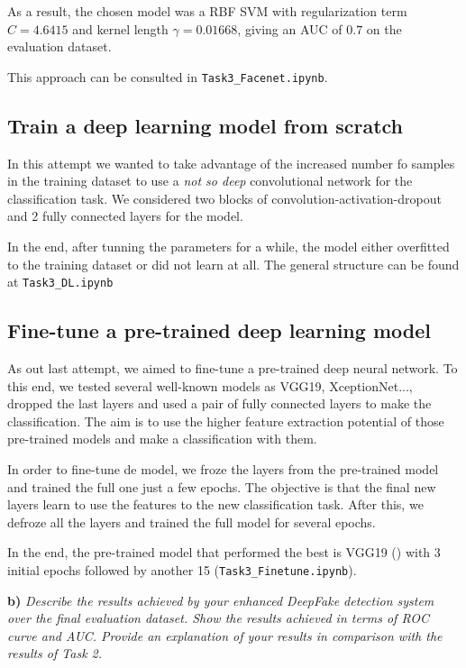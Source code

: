\documentclass[11pt]{article}
\begin{document}
As a result, the chosen model was a RBF SVM with regularization term \( C = 4.6415 \) and kernel length \( \gamma = 0.01668 \), giving an AUC of \( 0.7 \) on the evaluation dataset.

This approach can be consulted in \texttt{Task3\_Facenet.ipynb}.

\subsection*{Train a deep learning model from scratch}


In this attempt we wanted to take advantage of the increased number fo samples in the training dataset to use a \emph{not so deep} convolutional network for the classification task. We considered two blocks of convolution-activation-dropout and 2 fully connected layers for the model.  

In the end, after tunning the parameters for a while, the model either overfitted to the training dataset or did not learn at all. The general structure can be found at \texttt{Task3\_DL.ipynb}

\subsection*{Fine-tune a pre-trained deep learning model}


As out last attempt, we aimed to fine-tune a pre-trained deep neural network. To this end, we tested several well-known models as VGG19, XceptionNet..., dropped the last layers and used a pair of fully connected layers to make the classification. The aim is to use the higher feature extraction  potential of those pre-trained models and make a classification with them.

In order to fine-tune de model, we froze the layers from the pre-trained model and trained the full one just a few epochs. The objective is that the final new layers learn to use the features to the new classification task. After this, we defroze all the layers and trained the full model for several epochs.

In the end, the pre-trained model that performed the best is VGG19 (\cite{simonyan2015deep}) with 3 initial epochs followed by another 15 (\texttt{Task3\_Finetune.ipynb}).

\textbf{b)} \textit{Describe the results achieved by your enhanced DeepFake detection system over the final evaluation dataset. Show the results achieved in terms of ROC curve and AUC. Provide an explanation of your results in comparison with the results of Task 2.}
\end{document}
